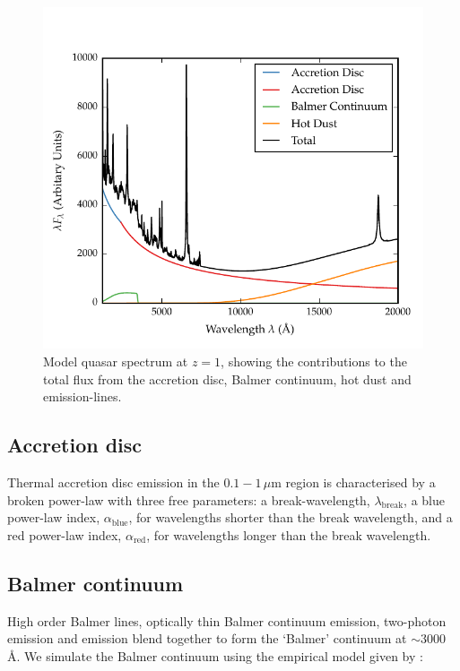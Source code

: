 \begin{figure}[h!]
  \centering
  \includegraphics[width=\textwidth]{figures/chapter05/sed_model.pdf}
  \caption[{Model quasar spectrum at $z=1$, showing the contributions to the total flux from the accretion disc, Balmer continuum, hot dust and emission-lines.}]{Model quasar spectrum at $z=1$, showing the contributions to the total flux from the accretion disc, Balmer continuum, hot dust and emission-lines. }
  \label{fig:modelsed}
\end{figure}

\subsection{Accretion disc}

Thermal accretion disc emission in the $0.1 - 1$\,$\mu$m region is characterised by a broken power-law with three free parameters: a break-wavelength, $\lambda_{\text{break}}$, a blue power-law index, $\alpha_{\text{blue}}$, for wavelengths shorter than the break wavelength, and a red power-law index, $\alpha_{\text{red}}$, for wavelengths longer than the break wavelength.

\subsection{Balmer continuum}

High order Balmer lines, optically thin Balmer continuum emission, two-photon emission and  emission blend together to form the `Balmer' continuum at $\sim3000$\,\AA.
We simulate the Balmer continuum using the empirical model given by \citet{grandi82}: 

